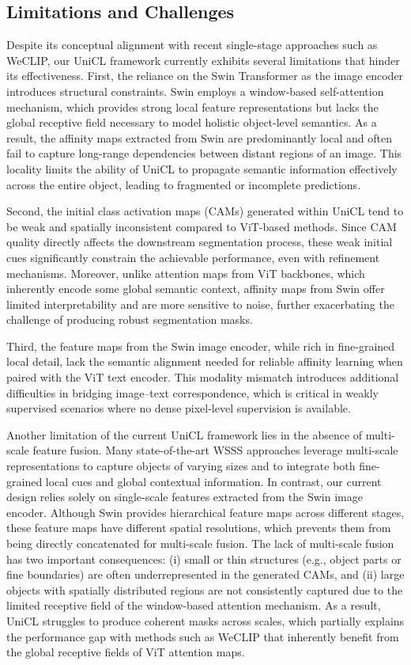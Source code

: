 \subsection{Limitations and Challenges}
\label{subsec:limitations_and_challenges}
Despite its conceptual alignment with recent single-stage approaches such as WeCLIP, our UniCL framework currently exhibits several limitations that hinder its effectiveness. First, the reliance on the Swin Transformer as the image encoder introduces structural constraints. Swin employs a window-based self-attention mechanism, which provides strong local feature representations but lacks the global receptive field necessary to model holistic object-level semantics. As a result, the affinity maps extracted from Swin are predominantly local and often fail to capture long-range dependencies between distant regions of an image. This locality limits the ability of UniCL to propagate semantic information effectively across the entire object, leading to fragmented or incomplete predictions.  

Second, the initial class activation maps (CAMs) generated within UniCL tend to be weak and spatially inconsistent compared to ViT-based methods. Since CAM quality directly affects the downstream segmentation process, these weak initial cues significantly constrain the achievable performance, even with refinement mechanisms. Moreover, unlike attention maps from ViT backbones, which inherently encode some global semantic context, affinity maps from Swin offer limited interpretability and are more sensitive to noise, further exacerbating the challenge of producing robust segmentation masks.  

Third, the feature maps from the Swin image encoder, while rich in fine-grained local detail, lack the semantic alignment needed for reliable affinity learning when paired with the ViT text encoder. This modality mismatch introduces additional difficulties in bridging image–text correspondence, which is critical in weakly supervised scenarios where no dense pixel-level supervision is available.  

Another limitation of the current UniCL framework lies in the absence of multi-scale feature fusion. Many state-of-the-art WSSS approaches leverage multi-scale representations to capture objects of varying sizes and to integrate both fine-grained local cues and global contextual information. In contrast, our current design relies solely on single-scale features extracted from the Swin image encoder. Although Swin provides hierarchical feature maps across different stages, these feature maps have different spatial resolutions, which prevents them from being directly concatenated for multi-scale fusion. The lack of multi-scale fusion has two important consequences: (i) small or thin structures (e.g., object parts or fine boundaries) are often underrepresented in the generated CAMs, and (ii) large objects with spatially distributed regions are not consistently captured due to the limited receptive field of the window-based attention mechanism. As a result, UniCL struggles to produce coherent masks across scales, which partially explains the performance gap with methods such as WeCLIP that inherently benefit from the global receptive fields of ViT attention maps.
 

